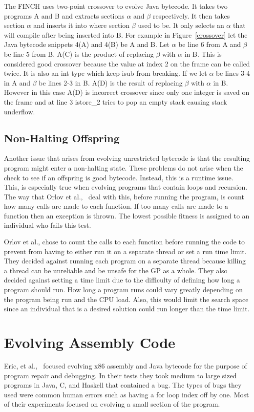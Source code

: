 \documentclass{sig-alternate}
\begin{document}
The FINCH uses two-point crossover to evolve Java bytecode. It takes two programs A and B and extracts sections $\alpha$ and $\beta$ respectively. It then takes section $\alpha$ and inserts it into where section $\beta$ used to be. It only selects an $\alpha$ that will compile after being inserted into B.
For example in Figure~\ref{crossover} let the Java bytecode snippets 4(A) and 4(B) be A and B. Let $\alpha$ be line 6 from A and $\beta$ be line 5 from B. A(C) is the product of replacing $\beta$ with $\alpha$ in B. This is considered good crossover because the value at index 2 on the frame can be called twice. It is also an int type which keep isub from breaking. If we let $\alpha$ be lines 3-4 in A and $\beta$ be lines 2-3 in B. A(D) is the result of replacing $\beta$ with $\alpha$ in B. However in this case A(D) is incorrect crossover since only one integer is saved on the frame and at line 3 istore\_2 tries to pop an empty stack causing stack underflow. 

\subsection{Non-Halting Offspring}
Another issue that arises from evolving unrestricted bytecode is that the resulting program might enter a non-halting state. These problems do not arise when the check to see if an offspring is good bytecode. Instead, this is a runtime issue. This, is especially true when evolving programs that contain loops and recursion.
The way that Orlov et al.,~\cite{FINCH:2011} deal with this, before running the program, is count how many calls are made to each function. If too many calls are made to a function then an exception is thrown. The lowest possible fitness is assigned to an individual who fails this test.

Orlov et al., chose to count the calls to each function before running the code to prevent from having to either run it on a separate thread or set a run time limit. They decided against running each program on a separate thread because killing a thread can be unreliable and be unsafe for the GP as a whole. They also decided against setting a time limit due to the difficulty of defining how long a program should run. How long a program runs could vary greatly depending on the program being run and the CPU load. Also, this would limit the search space since an individual that is a desired solution could run longer than the time limit.


\section{Evolving Assembly Code}
Eric, et al.,~\cite{Assembly:2010} focused evolving x86 assembly and Java bytecode for the purpose of program repair and debugging. In their tests they took medium to large sized programs in Java, C, and Haskell that contained a bug. The types of bugs they used were common human errors such as having a for loop index off by one. Most of their experiments focused on evolving a small section of the program. 
\end{document}
